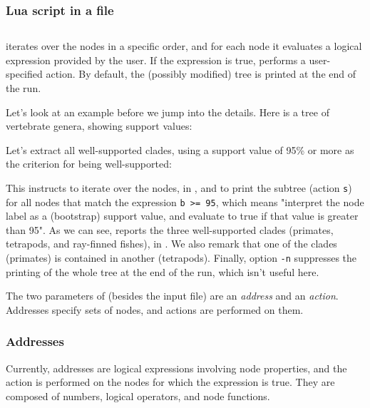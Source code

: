 \subsubsection{Lua script in a file}
\label{sct:lua_file_input}

\subsection{\ed}

\ed{} iterates over the nodes in a specific order, and for each node it
evaluates a logical expression provided by the user. If the expression is true,
\ed{} performs a user-specified action.  By default, the (possibly modified)
tree is printed at the end of the run.

Let's look at an example before we jump into the details. Here is a tree of vertebrate genera, showing support values:

\noindent{}Let's extract all well-supported clades, using a support value of 95\% or more as the criterion for being well-supported:


\begin{samepage}

\end{samepage}

\noindent{}This instructs \ed{} to iterate over the nodes, in \no{}, and to
print the subtree (action \texttt{s}) for all nodes that match the expression
\texttt{b >= 95}, which means "interpret the node label as a (bootstrap) support
value, and evaluate to true if that value is greater than 95". As we can see,
\ed{} reports the three well-supported clades (primates, tetrapods, and
ray-finned fishes), in \no. We also remark that one of the clades (primates) is
contained in another (tetrapods). Finally, option \texttt{-n} suppresses
the printing of the whole tree at the end of the run, which isn't useful here.

The two parameters of \ed{} (besides the input file) are an \emph{address} and
an \emph{action}. Addresses specify sets of nodes, and actions are performed on
them. 

\subsubsection{Addresses}

Currently, addresses are logical expressions involving node properties, and the
action is performed on the nodes for which the expression is true. They are
composed of numbers, logical operators, and node functions.

